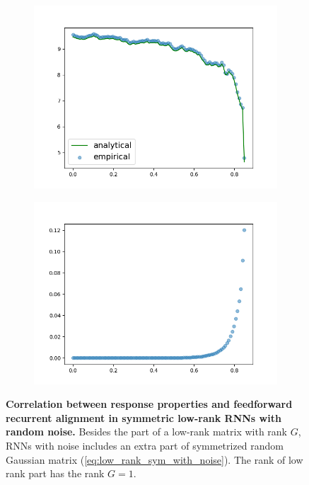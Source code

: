 \documentclass[11pt]{article}
\begin{document}
\begin{figure}[H]
\begin{subfigure}[b]{0.45\textwidth}
				\caption{}
			\end{subfigure}
			\newline
			\begin{subfigure}[b]{0.45\textwidth}
				\centering
				\includegraphics[width=\textwidth]{../figures/dim_low_rank_sym_with_noise.png}
				\caption{}
			\end{subfigure}
			\begin{subfigure}[b]{0.45\textwidth}
				\centering
				\includegraphics[width=\textwidth]{../figures/spont_align_low_rank_sym_with_noise.png}
				\caption{}
			\end{subfigure}
		\caption{\textbf{Correlation between response properties and feedforward recurrent alignment in symmetric low-rank RNNs with random noise.} Besides the part of a low-rank matrix with rank $G$, RNNs with noise includes an extra part of symmetrized random Gaussian matrix (\ref{eq:low_rank_sym_with_noise}). The rank of low rank part has the rank $G=1$.\\
}
\end{figure}
\end{document}
